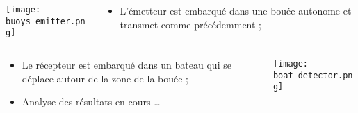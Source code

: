 \documentclass[../main.tex]{subfiles}
\begin{document}
\begin{frame}{\subsecname}
  \begin{columns}
    \begin{column}{.5\linewidth}
      \hfill \texttt{[image: buoys\_emitter.png]}
    \end{column}
    \begin{column}{.5\linewidth}
      \begin{itemize}
        \item L'émetteur est embarqué dans une bouée autonome et transmet comme précédemment ;
      \end{itemize}
    \end{column}
  \end{columns}
  \begin{columns}
    \begin{column}{.5\linewidth}
      \begin{itemize}
        \item Le récepteur est embarqué dans un bateau qui se déplace autour de la zone de la bouée ;
        \item Analyse des résultats en cours \dots
      \end{itemize}
    \end{column}
    \begin{column}{.5\linewidth}
      \texttt{[image: boat\_detector.png]} \hfill
    \end{column}
  \end{columns}
\end{frame}
\end{document}
